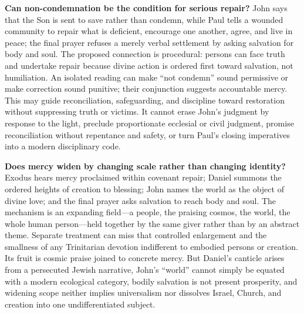 \noindent\textbf{Can non-condemnation be the condition for serious repair?\enspace{}}
John says that the Son is sent to save rather than condemn, while Paul tells a wounded community to repair what is deficient, encourage one another, agree, and live in peace; the final prayer refuses a merely verbal settlement by asking salvation for body and soul. The proposed connection is procedural: persons can face truth and undertake repair because divine action is ordered first toward salvation, not humiliation. An isolated reading can make “not condemn” sound permissive or make correction sound punitive; their conjunction suggests accountable mercy. This may guide reconciliation, safeguarding, and discipline toward restoration without suppressing truth or victims. It cannot erase John's judgment by response to the light, preclude proportionate ecclesial or civil judgment, promise reconciliation without repentance and safety, or turn Paul's closing imperatives into a modern disciplinary code.

\noindent\textbf{Does mercy widen by changing scale rather than changing identity?\enspace{}}
Exodus hears mercy proclaimed within covenant repair; Daniel summons the ordered heights of creation to blessing; John names the world as the object of divine love; and the final prayer asks salvation to reach body and soul. The mechanism is an expanding field---a people, the praising cosmos, the world, the whole human person---held together by the same giver rather than by an abstract theme. Separate treatment can miss that controlled enlargement and the smallness of any Trinitarian devotion indifferent to embodied persons or creation. Its fruit is cosmic praise joined to concrete mercy. But Daniel's canticle arises from a persecuted Jewish narrative, John's “world” cannot simply be equated with a modern ecological category, bodily salvation is not present prosperity, and widening scope neither implies universalism nor dissolves Israel, Church, and creation into one undifferentiated subject.
